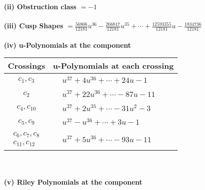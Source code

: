 \documentclass[1p]{elsarticle_modified}
\theoremstyle{definition}
\begin{document}
\flushleft \textbf{(ii) Obstruction class $= -1$}\\~\\
\flushleft \textbf{(iii) Cusp Shapes $= \frac{56806}{12181} u^{36}-\frac{266817}{12181} u^{35}+\cdots+\frac{12593355}{12181} u-\frac{1834736}{12181}$}\\~\\
\newpage\renewcommand{\arraystretch}{1}
\flushleft \textbf{(iv) u-Polynomials at the component}\newline \\
\begin{tabular}{m{50pt}|m{274pt}}
Crossings & \hspace{64pt}u-Polynomials at each crossing \\
\hline $$\begin{aligned}c_{1},c_{3}\end{aligned}$$&$\begin{aligned}
&u^{37}+4 u^{36}+\cdots+24 u-1
\end{aligned}$\\
\hline $$\begin{aligned}c_{2}\end{aligned}$$&$\begin{aligned}
&u^{37}+22 u^{36}+\cdots-87 u-11
\end{aligned}$\\
\hline $$\begin{aligned}c_{4},c_{10}\end{aligned}$$&$\begin{aligned}
&u^{37}+2 u^{35}+\cdots-31 u^2-3
\end{aligned}$\\
\hline $$\begin{aligned}c_{5},c_{9}\end{aligned}$$&$\begin{aligned}
&u^{37}- u^{36}+\cdots+3 u-1
\end{aligned}$\\
\hline $$\begin{aligned}c_{6},c_{7},c_{8}\\c_{11},c_{12}\end{aligned}$$&$\begin{aligned}
&u^{37}+5 u^{36}+\cdots-93 u-11
\end{aligned}$\\
\hline
\end{tabular}\\~\\
\newpage\renewcommand{\arraystretch}{1}
\flushleft \textbf{(v) Riley Polynomials at the component}\newline \\
\end{document}
